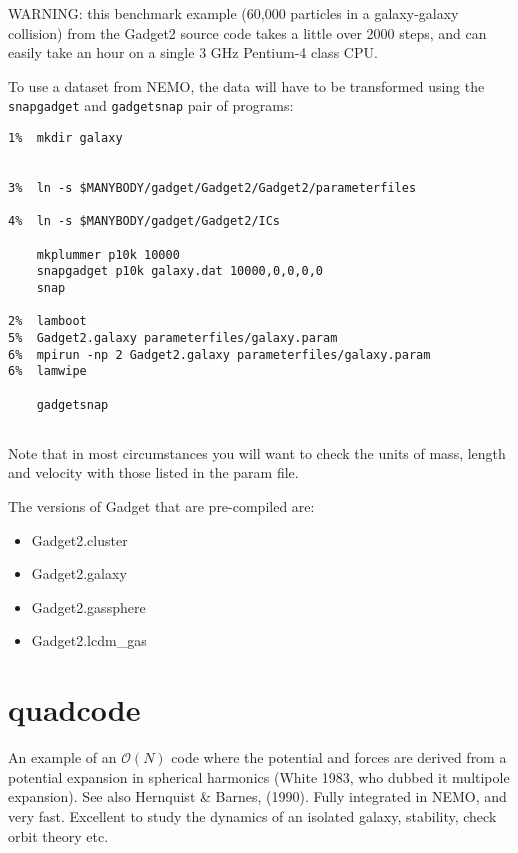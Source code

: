 WARNING: this benchmark example (60,000 particles in a galaxy-galaxy collision)
 from the Gadget2  source code takes a little
over 2000 steps,
and can easily take an hour on a single 3 GHz Pentium-4 class CPU. 

To use a dataset from NEMO, the data will have to be transformed using the
{\tt snapgadget} and {\tt gadgetsnap} pair of programs:

\footnotesize\begin{verbatim}
1%  mkdir galaxy


3%  ln -s $MANYBODY/gadget/Gadget2/Gadget2/parameterfiles

4%  ln -s $MANYBODY/gadget/Gadget2/ICs

    mkplummer p10k 10000
    snapgadget p10k galaxy.dat 10000,0,0,0,0
    snap

2%  lamboot
5%  Gadget2.galaxy parameterfiles/galaxy.param
6%  mpirun -np 2 Gadget2.galaxy parameterfiles/galaxy.param
6%  lamwipe

    gadgetsnap 


\end{verbatim}\normalsize

Note that in most circumstances you will want to check the units of mass, length and velocity
with those listed in the param file.

The versions of Gadget that are pre-compiled are:

\begin{itemize}
\item Gadget2.cluster  
\item Gadget2.galaxy   
\item Gadget2.gassphere
\item Gadget2.lcdm\_gas 
\end{itemize}

\section{quadcode}


An example of an $\mathcal{O}(N)$ code where the potential and forces are derived from
a potential expansion in spherical harmonics  (White 1983, who dubbed it multipole expansion). 
See also Hernquist \& Barnes, (1990). Fully integrated
in NEMO, and very fast. Excellent to study the dynamics of an isolated galaxy,
stability, check orbit theory etc.

